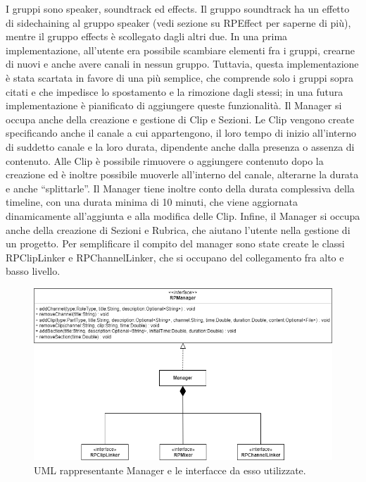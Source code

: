 \documentclass[a4paper,12pt]{report}
\begin{document}
I gruppi sono speaker, soundtrack ed effects. Il gruppo soundtrack ha un effetto di sidechaining al gruppo speaker (vedi sezione su RPEffect per saperne di più), mentre il gruppo effects è scollegato dagli altri due. In una prima implementazione, all’utente era possibile scambiare elementi fra i gruppi, crearne di nuovi e anche avere canali in nessun gruppo. Tuttavia, questa implementazione è stata scartata in favore di una più semplice, che comprende solo i gruppi sopra citati e che impedisce lo spostamento e la rimozione dagli stessi; in una futura implementazione è pianificato di aggiungere queste funzionalità. Il Manager si occupa anche della creazione e gestione di Clip e Sezioni. Le Clip vengono create specificando anche il canale a cui appartengono, il loro tempo di inizio all’interno di suddetto canale e la loro durata, dipendente anche dalla presenza o assenza di contenuto. Alle Clip è possibile rimuovere o aggiungere contenuto dopo la creazione ed è inoltre possibile muoverle all’interno del canale, alterarne la durata e anche “splittarle”. Il Manager tiene inoltre conto della durata complessiva della timeline, con una durata minima di 10 minuti, che viene aggiornata dinamicamente all’aggiunta e alla modifica delle Clip. Infine, il Manager si occupa anche della creazione di Sezioni e Rubrica, che aiutano l’utente nella gestione di un progetto. Per semplificare il compito del manager sono state create le classi RPClipLinker e RPChannelLinker, che si occupano del collegamento fra alto e basso livello.

\begin{figure}[H]
\centering{}
\includegraphics[width=\textwidth]{img/manager.png}
\caption{UML rappresentante Manager e le interfacce da esso utilizzate.}
\end{figure}
\end{document}
